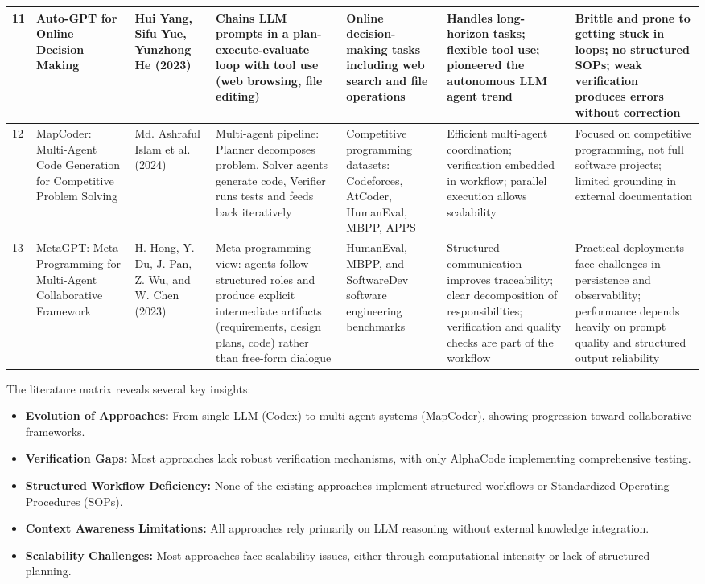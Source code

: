 \begin{table}[H]
{\begin{tabular}{|l|p{2.2cm}|p{1.8cm}|p{2.4cm}|p{2.0cm}|p{2.2cm}|p{2.4cm}|}
\hline
11 & Auto-GPT for Online Decision Making & Hui Yang, Sifu Yue, Yunzhong He (2023) & Chains LLM prompts in a plan-execute-evaluate loop with tool use (web browsing, file editing) & Online decision-making tasks including web search and file operations & Handles long-horizon tasks; flexible tool use; pioneered the autonomous LLM agent trend & Brittle and prone to getting stuck in loops; no structured SOPs; weak verification produces errors without correction \\
\hline
12 & MapCoder: Multi-Agent Code Generation for Competitive Problem Solving & Md. Ashraful Islam et al. (2024) & Multi-agent pipeline: Planner decomposes problem, Solver agents generate code, Verifier runs tests and feeds back iteratively & Competitive programming datasets: Codeforces, AtCoder, HumanEval, MBPP, APPS & Efficient multi-agent coordination; verification embedded in workflow; parallel execution allows scalability & Focused on competitive programming, not full software projects; limited grounding in external documentation \\
\hline
13 & MetaGPT: Meta Programming for Multi-Agent Collaborative Framework & H. Hong, Y. Du, J. Pan, Z. Wu, and W. Chen (2023) & Meta programming view: agents follow structured roles and produce explicit intermediate artifacts (requirements, design plans, code) rather than free-form dialogue & HumanEval, MBPP, and SoftwareDev software engineering benchmarks & Structured communication improves traceability; clear decomposition of responsibilities; verification and quality checks are part of the workflow & Practical deployments face challenges in persistence and observability; performance depends heavily on prompt quality and structured output reliability \\
\hline
\end{tabular}%
}
\end{table}

The literature matrix reveals several key insights:

\begin{itemize}
    \item \textbf{Evolution of Approaches:} From single LLM (Codex) to multi-agent systems (MapCoder), showing progression toward collaborative frameworks.
    \item \textbf{Verification Gaps:} Most approaches lack robust verification mechanisms, with only AlphaCode implementing comprehensive testing.
    \item \textbf{Structured Workflow Deficiency:} None of the existing approaches implement structured workflows or Standardized Operating Procedures (SOPs).
    \item \textbf{Context Awareness Limitations:} All approaches rely primarily on LLM reasoning without external knowledge integration.
    \item \textbf{Scalability Challenges:} Most approaches face scalability issues, either through computational intensity or lack of structured planning.
\end{itemize}

